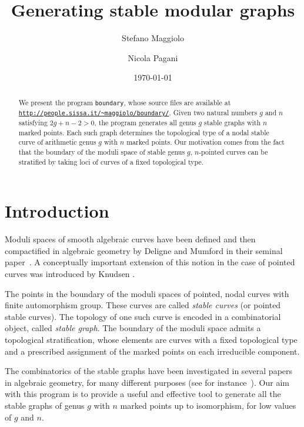 \documentclass{amsart}
\title{Generating stable modular graphs}
\author{Stefano Maggiolo}
\author{Nicola Pagani}
\date{\today}
\theoremstyle{plain}
\theoremstyle{definition}
\begin{document}
\begin{abstract}
  We present the program \texttt{boundary}, whose source files are
  available at \href{http://people.sissa.it/~maggiolo/boundary/}
  {\texttt{http://people.sissa.it/\~{}maggiolo/boundary/}}. Given two
  natural numbers $g$ and $n$ satisfying $2g+n-2>0$, the program
  generates all genus $g$ stable graphs with $n$ marked points. Each
  such graph determines the topological type of a nodal stable curve
  of arithmetic genus $g$ with $n$ marked points. Our motivation comes
  from the fact that the boundary of the moduli space of stable genus
  $g$, $n$-pointed curves can be stratified by taking loci of curves
  of a fixed topological type.
\end{abstract}

\maketitle
\setcounter{tocdepth}{1}
\tableofcontents



\section{Introduction}

Moduli spaces of smooth algebraic curves have been defined and then
compactified in algebraic geometry by Deligne and Mumford in their
seminal paper~\cite{delignemumford}. A conceptually important
extension of this notion in the case of pointed curves was introduced
by Knudsen \cite{knudsen}.

The points in the boundary of the moduli spaces of pointed, nodal
curves with finite automorphism group. These curves are called
\emph{stable curves} (or pointed stable curves). The topology of one
such curve is encoded in a combinatorial object, called \emph{stable
  graph}.  The boundary of the moduli space admits a topological
stratification, whose elements are curves with a fixed topological
type and a prescribed assignment of the marked points on each
irreducible component.

The combinatorics of the stable graphs have been investigated in
several papers in algebraic geometry, for many different purposes (see
for instance~\cite{modularoperads,opstall,opstall2,stephanie2}). Our
aim with this program is to provide a useful and effective tool to
generate all the stable graphs of genus $g$ with $n$ marked points up
to isomorphism, for low values of $g$ and $n$.
\end{document}

